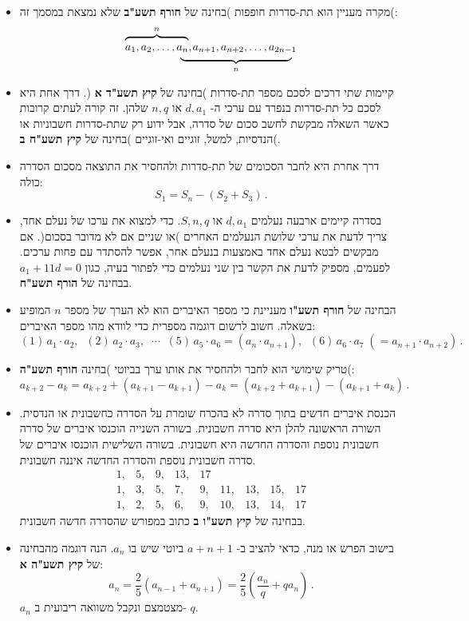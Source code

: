 \begin{itemize}
\item
מקרה מעניין הוא תת-סדרות חופפות )בחינה של 
\textbf{חורף תשע"ב}
שלא נמצאת במסמך זה(:
\[
\renewcommand{\arraystretch}{.4}
\begin{array}{ll}
\overbrace{\rule{0pt}{8pt}a_1, a_2, \ldots, a_n}^{n},&\hspace{-9pt}a_{n+1}, a_{n+2}, \ldots, a_{2n-1}\\
&\hspace{-2em}\underbrace{\rule{10em}{0pt}}_{n}
\end{array}
\]
\vspace{-4ex}
\item
קיימות שתי דרכים לסכם מספר תת-סדרות )בחינה של
\textbf{קיץ תשע"ד א}%
(. דרך אחת היא לסכם כל תת-סדרות בנפרד עם ערכי ה-%
$d, a_1$
או
$n, q$
שלהן. זה קורה לעתים קרובות כאשר השאלה מבקשת לחשב סכום של סדרה, אבל ידוע רק שתת-סדרות חשבוניות או הנדסיות, למשל, זוגיים ואי-זוגיים )בחינה של
\textbf{קיץ תשע"ח ב}(.
\item 
דרך אחרת היא לחבר הסכומים של תת-סדרות ולהחסיר את התוצאה מסכום הסדרה כולה:
\[
S_1 = S_n - (S_2+S_3)\,.
\]
\vspace{-6ex}

\item
בסדרה קיימים ארבעה נעלמים
$d, a_1$
או
$S, n, q$.
כדי למצוא את ערכו של נעלם אחד, צריך לדעת את ערכי שלושת הנעלמים האחרים )או שניים אם לא מדובר בסכום(. אם מבקשים לבטא נעלם אחד באמצעות בנעלם אחר, אפשר להסתדר עם פחות ערכים. לפעמים, מספיק לדעת את הקשר בין שני נעלמים כדי לפתור בעיה, כגון
$a_1+11d = 0$
בבחינה של
\textbf{הורף תשע"ח}.

\item
הבחינה של
\textbf{חורף תשע"ו}
מעניינת כי מספר האיברים הוא לא הערך של מספר 
$n$
המופיע בשאלה. חשוב לרשום דוגמה מספרית כדי לוודא מהו מספר האיברים:
\[
(1)\, a_1\cdot a_2,\;\; (2)\,a_2\cdot a_3,\;\;\cdots\;\; (5)\,a_5\cdot a_6=(a_n\cdot a_{n+1}),\;\; (6)\,a_6\cdot a_7 \;(= a_{n+1}\cdot a_{n+2})\,.
\]

\item
טריק שימושי הוא לחבר ולהחסיר את אותו ערך בביוטי )בחינה 
\textbf{חורף תשע"ה}(:
\[
a_{k+2} - a_{k} = a_{k+2}+(a_{k+1}-a_{k+1})-a_{k} = (a_{k+2}+a_{k+1})-(a_{k+1}+a_{k})\,.
\]

\item
הכנסת איברים חדשים בתוך סדרה לא בהכרח שומרת על הסדרה כחשבונית או הנדסית. השורה הראשונה להלן היא סדרה חשבונית. בשורה השנייה הוכנסו איברים של סדרה חשבונית נוספת והסדרה החדשה היא חשבונית. בשורה השלישית הוכנסו איברים של סדרה חשבונית נוספת והסדרה החדשה איננה חשבונית.
\[
\begin{array}{rrrrrrrrrrrrr}
1,& 5,& 9,& 13,& 17\\
1, &3,& 5,&7,& 9,& 11,& 13, &15, & 17\\
1, &2,& 5,&6,& 9,& 10,& 13, &14, & 17
\end{array}
\]
בבחינה של
\textbf{קיץ תשע"ו ב}
כתוב במפורש שהסדרה חדשה חשבונית.

\item
בישוב הפרש או מנה, כדאי להציב ב-%
$a+{n+1}$
ביוטי שיש בו 
$a_n$.
הנה דוגמה מהבחינה של 
\textbf{קיץ תשע"ה א}:
\[
a_n = \frac{2}{5}(a_{n-1}+a_{n+1}) =\frac{2}{5}\left(\frac{a_n}{q}+qa_n\right)\,.
\]
$a_n$
מצטמצם ונקבל משוואה ריבועית ב-%
$q$.

\end{itemize}

